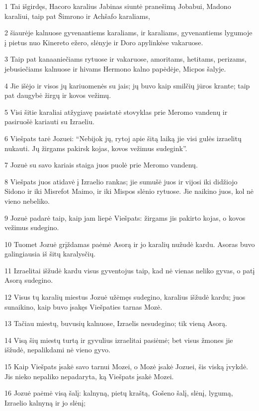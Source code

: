 \par 1 Tai išgirdęs, Hacoro karalius Jabinas siuntė pranešimą Jobabui, Madono karaliui, taip pat Šimrono ir Achšafo karaliams, 
\par 2 šiaurėje kalnuose gyvenantiems karaliams, ir karaliams, gyvenantiems lygumoje į pietus nuo Kinereto ežero, slėnyje ir Doro apylinkėse vakaruose. 
\par 3 Taip pat kanaaniečiams rytuose ir vakaruose, amoritams, hetitams, perizams, jebusiečiams kalnuose ir hivams Hermono kalno papėdėje, Micpos šalyje. 
\par 4 Jie išėjo ir visos jų kariuomenės su jais; jų buvo kaip smilčių jūros krante; taip pat daugybė žirgų ir kovos vežimų. 
\par 5 Visi šitie karaliai atžygiavę pasistatė stovyklas prie Meromo vandenų ir pasiruošė kariauti su Izraeliu. 
\par 6 Viešpats tarė Jozuei: “Nebijok jų, rytoj apie šitą laiką jie visi gulės izraelitų nukauti. Jų žirgams pakirsk kojas, kovos vežimus sudegink”. 
\par 7 Jozuė su savo kariais staiga juos puolė prie Meromo vandenų. 
\par 8 Viešpats juos atidavė į Izraelio rankas; jie sumušė juos ir vijosi iki didžiojo Sidono ir iki Misrefot Maimo, ir iki Mispos slėnio rytuose. Jie naikino juos, kol nė vieno nebeliko. 
\par 9 Jozuė padarė taip, kaip jam liepė Viešpats: žirgams jis pakirto kojas, o kovos vežimus sudegino. 
\par 10 Tuomet Jozuė grįždamas paėmė Asorą ir jo karalių nužudė kardu. Asoras buvo galingiausia iš šitų karalysčių. 
\par 11 Izraelitai išžudė kardu visus gyventojus taip, kad nė vienas neliko gyvas, o patį Asorą sudegino. 
\par 12 Visus tų karalių miestus Jozuė užėmęs sudegino, karalius išžudė kardu; juos sunaikino, kaip buvo įsakęs Viešpaties tarnas Mozė. 
\par 13 Tačiau miestų, buvusių kalnuose, Izraelis nesudegino; tik vieną Asorą. 
\par 14 Visą šių miestų turtą ir gyvulius izraelitai pasiėmė; bet visus žmones jie išžudė, nepalikdami nė vieno gyvo. 
\par 15 Kaip Viešpats įsakė savo tarnui Mozei, o Mozė įsakė Jozuei, šis viską įvykdė. Jis nieko nepaliko nepadaryta, ką Viešpats įsakė Mozei. 
\par 16 Jozuė paėmė visą šalį: kalnyną, pietų kraštą, Gošeno šalį, slėnį, lygumą, Izraelio kalnyną ir jo slėnį; 
